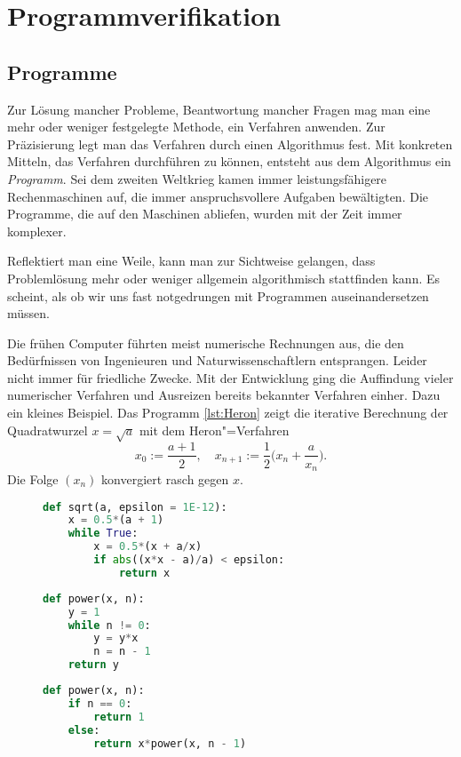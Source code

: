 
\chapter{Programmverifikation}

\section{Programme}

Zur Lösung mancher Probleme, Beantwortung mancher Fragen mag man eine
mehr oder weniger festgelegte Methode, ein Verfahren anwenden.
Zur Präzisierung legt man das Verfahren durch einen Algorithmus fest.
Mit konkreten Mitteln, das Verfahren durchführen zu können, entsteht
aus dem Algorithmus ein \emph{Programm}. Sei dem zweiten Weltkrieg kamen
immer leistungsfähigere Rechenmaschinen auf, die immer anspruchsvollere
Aufgaben bewältigten. Die Programme, die auf den Maschinen abliefen,
wurden mit der Zeit immer komplexer.

Reflektiert man eine Weile, kann man zur Sichtweise gelangen, dass
Problemlösung mehr oder weniger allgemein algorithmisch stattfinden
kann. Es scheint, als ob wir uns fast notgedrungen mit Programmen
auseinandersetzen müssen.

Die frühen Computer führten meist numerische Rechnungen aus, die den
Bedürfnissen von Ingenieuren und Naturwissenschaftlern entsprangen.
Leider nicht immer für friedliche Zwecke. Mit der Entwicklung ging
die Auffindung vieler numerischer Verfahren und Ausreizen bereits
bekannter Verfahren einher. Dazu ein kleines Beispiel. Das Programm
\ref{lst:Heron} zeigt die iterative Berechnung der Quadratwurzel $x=\sqrt{a}$
mit dem Heron"=Verfahren
\[x_0 := \frac{a + 1}{2},\quad x_{n+1} := \frac{1}{2}\Big(x_n + \frac{a}{x_n}\Big).\]
Die Folge $(x_n)$ konvergiert rasch gegen $x$.

\begin{figure}
\begin{lstlisting}[language=Python,%
label=lst:Heron,
caption={Programm zur iterativen Berechnung von Quadratwurzeln}]
def sqrt(a, epsilon = 1E-12):
    x = 0.5*(a + 1)
    while True:
        x = 0.5*(x + a/x)
        if abs((x*x - a)/a) < epsilon:
            return x
\end{lstlisting}
\begin{minipage}[t]{.48\textwidth}
\begin{lstlisting}[language=Python,%
label=lst:Potenz,%
caption={\raggedright Programm zur iterativen Berechnung der Potenz $x^n$}]
def power(x, n):
    y = 1
    while n != 0:
        y = y*x
        n = n - 1
    return y
\end{lstlisting}
\end{minipage}
\hfill
\begin{minipage}[t]{.48\textwidth}
\begin{lstlisting}[language=Python,%
caption={\raggedright Programm zur rekursiven Berechnung der Potenz $x^n$}]
def power(x, n):
    if n == 0:
        return 1
    else:
        return x*power(x, n - 1)
\end{lstlisting}
\end{minipage}
\end{figure}

